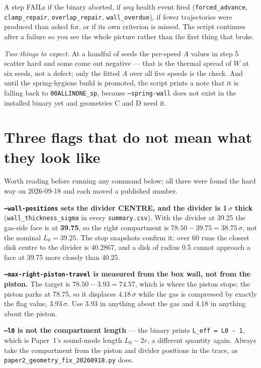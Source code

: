 \documentclass[11pt,a4paper]{article}
\newcommand{\cmd}[1]{\texttt{\footnotesize #1}}
\begin{document}
A step FAILs if the binary aborted, if \emph{any} health event fired
(\cmd{forced\_advance}, \cmd{clamp\_repair}, \cmd{overlap\_repair}, \cmd{wall\_overdue}), if fewer
trajectories were produced than asked for, or if its own criterion is missed. The script continues
after a failure so you see the whole picture rather than the first thing that broke.

\emph{Two things to expect.} At a handful of seeds the per-speed $A$ values in step 5 scatter hard
and some come out negative --- that is the thermal spread of $W$ at six seeds, not a defect; only
the fitted $A$ over all five speeds is the check. And until the spring-hygiene build is promoted,
the script prints a note that it is falling back to \cmd{00ALLINONE\_sp}, because
\cmd{--spring-wall} does not exist in the installed binary yet and geometries C and D need it.

\section{Three flags that do not mean what they look like}

Worth reading before running any command below; all three were found the hard way on 2026-09-18 and each moved a
published number.

\begin{howto}
\textbf{\cmd{--wall-positions} sets the divider CENTRE, and the divider is 1\,$\sigma$ thick}
(\cmd{wall\_thickness\_sigma} in every \cmd{summary.csv}). With the divider at 39.25 the gas-side face is at
\textbf{39.75}, so the right compartment is $78.50 - 39.75 = 38.75\,\sigma$, not the nominal $L_0 = 39.25$. The stop
snapshots confirm it: over 60 runs the closest disk centre to the divider is 40.2867, and a disk of radius 0.5 cannot
approach a face at 39.75 more closely than 40.25.

\textbf{\cmd{--max-right-piston-travel} is measured from the box wall, not from the piston.} The target is
$78.50 - 3.93 = 74.57$, which is where the piston stops; the piston parks at 78.75, so it displaces
$4.18\,\sigma$ while the gas is compressed by exactly the flag value, $3.93\,\sigma$. Use 3.93 in anything about the
gas and 4.18 in anything about the piston.

\textbf{\cmd{--l0} is not the compartment length} --- the binary prints \cmd{L\_eff = L0 - 1}, which is Paper~1's
sound-mode length $L_0 - 2r$, a different quantity again. Always take the compartment from the piston and divider
positions in the trace, as \cmd{paper2\_geometry\_fix\_20260918.py} does.
\end{howto}
\end{document}
